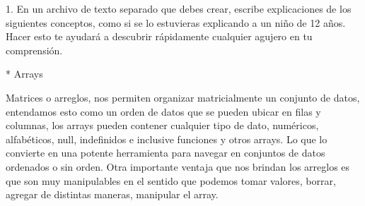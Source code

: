1. En un archivo de texto separado que debes crear, escribe explicaciones de los siguientes conceptos, 
como si se lo estuvieras explicando a un niño de 12 años. Hacer esto te ayudará a descubrir 
rápidamente cualquier agujero en tu comprensión.

	* Arrays

    Matrices o arreglos, nos permiten organizar matricialmente un conjunto de datos, entendamos 
    esto como un orden de datos que se pueden ubicar en filas y columnas, los arrays pueden contener 
    cualquier tipo de dato, numéricos, alfabéticos, null, indefinidos e inclusive funciones y otros arrays. 
    Lo que lo convierte en una potente herramienta para navegar en conjuntos de datos ordenados o sin orden. 
    Otra importante ventaja que nos brindan los arreglos es que son muy manipulables en el sentido que 
    podemos tomar valores, borrar, agregar de distintas maneras, manipular el array.

